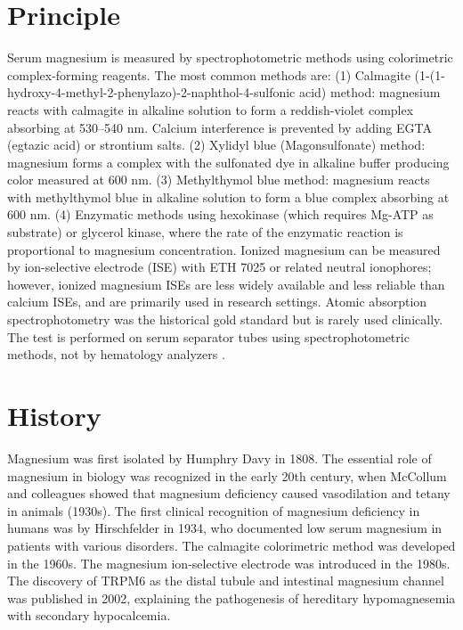 \section*{Principle}
Serum magnesium is measured by spectrophotometric methods using colorimetric complex-forming reagents. The most common methods are: (1) Calmagite (1-(1-hydroxy-4-methyl-2-phenylazo)-2-naphthol-4-sulfonic acid) method: magnesium reacts with calmagite in alkaline solution to form a reddish-violet complex absorbing at 530--540 nm. Calcium interference is prevented by adding EGTA (egtazic acid) or strontium salts. (2) Xylidyl blue (Magonsulfonate) method: magnesium forms a complex with the sulfonated dye in alkaline buffer producing color measured at 600 nm. (3) Methylthymol blue method: magnesium reacts with methylthymol blue in alkaline solution to form a blue complex absorbing at 600 nm. (4) Enzymatic methods using hexokinase (which requires Mg-ATP as substrate) or glycerol kinase, where the rate of the enzymatic reaction is proportional to magnesium concentration. Ionized magnesium can be measured by ion-selective electrode (ISE) with ETH 7025 or related neutral ionophores; however, ionized magnesium ISEs are less widely available and less reliable than calcium ISEs, and are primarily used in research settings. Atomic absorption spectrophotometry was the historical gold standard but is rarely used clinically. The test is performed on serum separator tubes using spectrophotometric methods, not by hematology analyzers \cite{tietz2023textbook}.

\section*{History}
Magnesium was first isolated by Humphry Davy in 1808. The essential role of magnesium in biology was recognized in the early 20th century, when McCollum and colleagues showed that magnesium deficiency caused vasodilation and tetany in animals (1930s). The first clinical recognition of magnesium deficiency in humans was by Hirschfelder in 1934, who documented low serum magnesium in patients with various disorders. The calmagite colorimetric method was developed in the 1960s. The magnesium ion-selective electrode was introduced in the 1980s. The discovery of TRPM6 as the distal tubule and intestinal magnesium channel was published in 2002, explaining the pathogenesis of hereditary hypomagnesemia with secondary hypocalcemia.

